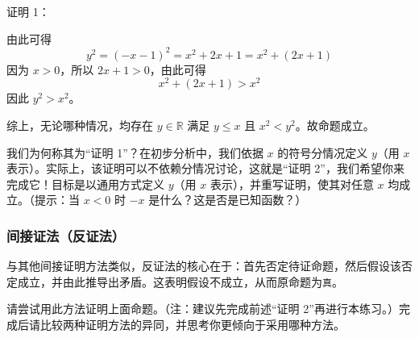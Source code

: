\begin{example}[两数中较小数的平方可能更大]
\begin{center}
{{\begin{proofs}{证明 1：}
\begin{itemize}
                            由此可得
                            \[y^2 = (-x-1)^2 = x^2+2x+1 = x^2+(2x+1)\]
                            因为 $x > 0$，所以 $2x+1 > 0$，由此可得
                            \[x^2+(2x+1) > x^2\]
                            因此 $y^2 > x^2$。
                    \end{itemize}
                    综上，无论哪种情况，均存在 $y \in \mathbb{R}$ 满足 $y \le x$ 且 $x^2 < y^2$。故命题成立。
                \end{proofs}
            }
        }
    \end{center}
\end{example}

我们为何称其为``证明 1''？在初步分析中，我们依据 $x$ 的符号分情况定义 $y$（用 $x$ 表示）。实际上，该证明可以不依赖分情况讨论，这就是``证明 2''，我们希望你来完成它！目标是以通用方式定义 $y$（用 $x$ 表示），并重写证明，使其对任意 $x$ 均成立。（提示：当 $x < 0$ 时 $-x$ 是什么？这是否是已知函数？）

\subsubsection*{间接证法（反证法）}

与其他间接证明方法类似，反证法的核心在于：首先否定待证命题，然后假设该否定成立，并由此推导出矛盾。这表明假设不成立，从而原命题为\verb|真|。

请尝试用此方法证明上面命题。（注：建议先完成前述``证明 2''再进行本练习。）完成后请比较两种证明方法的异同，并思考你更倾向于采用哪种方法。

\begin{center}
    \noindent {}
\end{center}

\clearpage